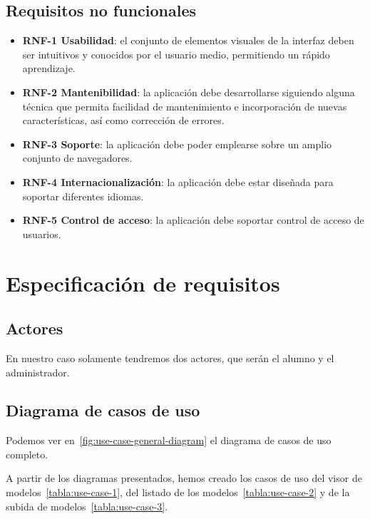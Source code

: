 \subsection{Requisitos no funcionales}
\begin{itemize}
	\item \textbf{RNF-1 Usabilidad}: el conjunto de elementos visuales de la interfaz deben ser intuitivos y conocidos por el usuario medio, permitiendo un rápido aprendizaje.
	\item \textbf{RNF-2 Mantenibilidad}: la aplicación debe desarrollarse siguiendo alguna técnica que permita facilidad de mantenimiento e incorporación de nuevas características, así como corrección de errores.
	\item \textbf{RNF-3 Soporte}: la aplicación debe poder emplearse sobre un amplio conjunto de navegadores.
	\item \textbf{RNF-4 Internacionalización}: la aplicación debe estar diseñada para soportar diferentes idiomas.
	\item \textbf{RNF-5 Control de acceso}: la aplicación debe soportar control de acceso de usuarios.
\end{itemize}

\section{Especificación de requisitos}

\subsection{Actores}
En nuestro caso solamente tendremos dos actores, que serán el alumno y el administrador.

\subsection{Diagrama de casos de uso}\label{diagrama-de-casos-de-uso}
Podemos ver en~\ref{fig:use-case-general-diagram} el diagrama de casos de uso completo.

\begin{landscape}
\end{landscape}


A partir de los diagramas presentados, hemos creado los casos de uso del visor de modelos~\ref{tabla:use-case-1}, del listado de los modelos~\ref{tabla:use-case-2} y de la subida de modelos~\ref{tabla:use-case-3}.

